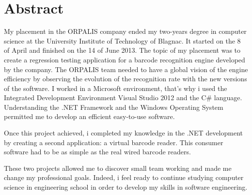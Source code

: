 \chapter*{Abstract}

My placement in the ORPALIS company ended my two-years degree in computer science at the University Institute of Technology of Blagnac. It started on the 8 of April and finished on the 14 of June 2013. The topic of my placement was to create a regression testing application for a barcode recognition engine developed by the company. The ORPALIS team needed to have a global vision of the engine efficiency by observing the evolution of the recognition rate with the new versions of the software. I worked in a Microsoft environment, that's why i used the Integrated Development Environment Visual Studio 2012 and the C\# language. Understanding the .NET Framework and the Windows Operating System permitted me to develop an efficient easy-to-use software.

Once this project achieved, i completed my knowledge in the .NET development by creating a second application: a virtual barcode reader. This consumer software had to be as simple as the real wired barcode readers.

These two projects allowed me to discover small team working and made me change my professional goals. Indeed, i feel ready to continue studying computer science in engineering school in order to develop my skills in software engineering.